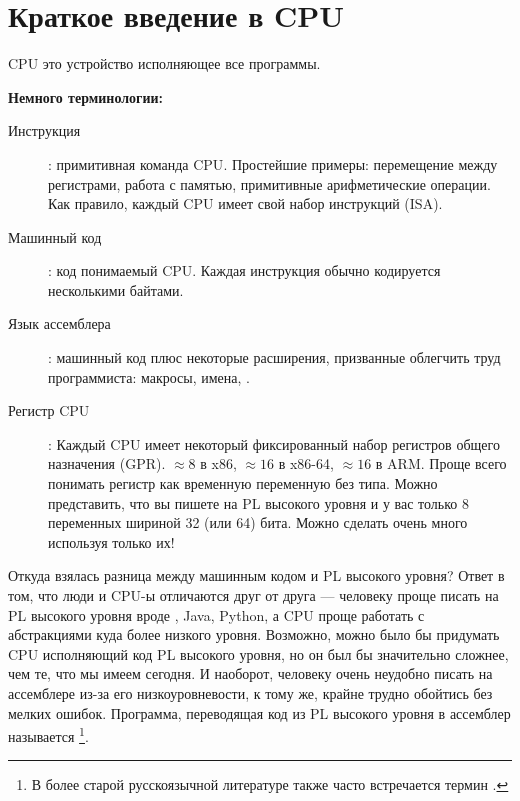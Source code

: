 \ifdefined\RUSSIAN
\chapter{Краткое введение в CPU}

\ac{CPU} это устройство исполняющее все программы.

\textbf{Немного терминологии:}

\begin{description}
\item[Инструкция]: примитивная команда \ac{CPU}.
Простейшие примеры: перемещение между регистрами, работа с памятью, примитивные арифметические операции.
Как правило, каждый \ac{CPU} имеет свой набор инструкций (\ac{ISA}).

\item[Машинный код]: код понимаемый \ac{CPU}. 
Каждая инструкция обычно кодируется несколькими байтами.
\item[Язык ассемблера]: машинный код плюс некоторые расширения, призванные облегчить труд программиста: макросы, имена, \etc.
\item[Регистр CPU]: Каждый \ac{CPU} имеет некоторый фиксированный набор регистров общего назначения (\ac{GPR}).
$\approx 8$ в x86, $\approx 16$ в x86-64, $\approx 16$ в ARM.
Проще всего понимать регистр как временную переменную без типа.
Можно представить, что вы пишете на \ac{PL} высокого уровня и у вас только 8 переменных шириной 32 (или 64) бита.
Можно сделать очень много используя только их!
\end{description}


Откуда взялась разница между машинным кодом и \ac{PL} высокого уровня?  Ответ в том, что люди и \ac{CPU}-ы отличаются друг от друга ---
человеку проще писать на \ac{PL} высокого уровня вроде \CCpp, Java, Python, а \ac{CPU} проще работать с абстракциями куда более низкого уровня.
Возможно, можно было бы придумать \ac{CPU} исполняющий код \ac{PL} высокого уровня, но он был бы значительно сложнее, чем те, что мы имеем сегодня.
И наоборот, человеку очень неудобно писать на ассемблере из-за его низкоуровневости, к тому же, крайне трудно обойтись без мелких ошибок.
Программа, переводящая код из \ac{PL} высокого уровня в ассемблер называется 
\footnote{В более старой русскоязычной литературе также часто встречается термин .}.

\ifx\LITE\undefined
{}%
%
%

